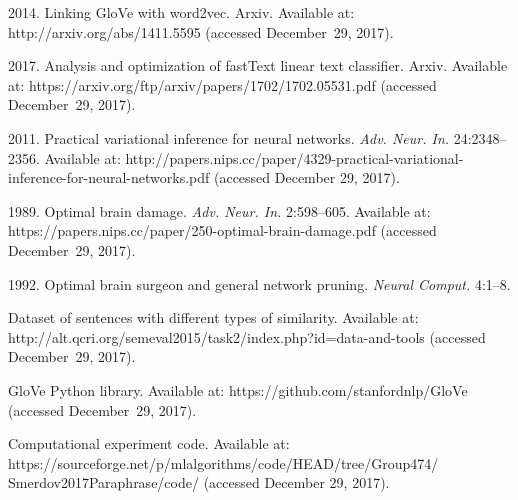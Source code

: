 \begin{multicols}{2}
{{\begin{thebibliography}{99}
 2014. Linking GloVe with word2vec. 
{Arxiv}. Available at: {\sf 
http://arxiv.org/abs/1411.5595} (accessed December~29, 2017).

 2017. Analysis and optimization of fastText 
linear text classifier. {Arxiv}. 
Available at: {\sf 
https://arxiv.org/ftp/arxiv/papers/1702/1702.05531.\linebreak pdf} (accessed December~29, 2017).

 2011. Practical variational inference for neural networks.
 \textit{Adv. Neur. In.} 24:2348--2356. 
 Available at: {\sf  
 http://papers.nips.cc/paper/4329-practical-variational-inference-for-neural-networks.pdf} (accessed December 29, 2017).

 1989. Optimal brain damage. 
\textit{Adv. Neur. In.} 
2:598--605. Available at: 
{\sf https://papers.nips.cc/paper/250-optimal-brain-damage.pdf}
(accessed December~29, 2017).

1992. Optimal brain surgeon and general network pruning. 
\textit{Neural Comput.} 4:1--8.

Dataset of sentences with different types of similarity.
 Available at: {\sf  http://alt.qcri.org/semeval2015/task2/\linebreak index.php?id=data-and-tools} 
 (accessed December~29, 2017).



GloVe Python library. Available at: 
{\sf https://github.com/\linebreak stanfordnlp/GloVe} (accessed December~29, 2017).

 Computational experiment code. Available at: {\sf 
https://sourceforge.net/p/mlalgorithms/code/\linebreak  HEAD/tree/Group474/
Smerdov2017Paraphrase/code/} (accessed December 29, 2017).
\end{thebibliography}

 }
 }

\end{multicols}

\vspace*{-16pt}

